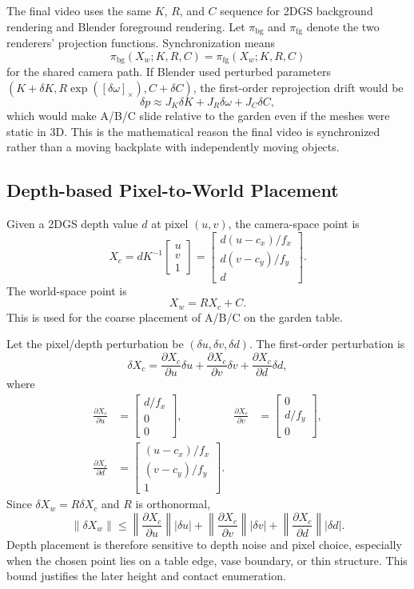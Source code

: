 \documentclass[10pt,twocolumn,letterpaper]{article}
\begin{document}
The final video uses the same $K$, $R$, and $C$ sequence for 2DGS background rendering and Blender foreground rendering.
Let $\pi_{\mathrm{bg}}$ and $\pi_{\mathrm{fg}}$ denote the two renderers' projection functions.
Synchronization means
\[
\pi_{\mathrm{bg}}(X_w;K,R,C)=\pi_{\mathrm{fg}}(X_w;K,R,C)
\]
for the shared camera path.
If Blender used perturbed parameters $(K+\delta K,R\exp([\delta\omega]_\times),C+\delta C)$, the first-order reprojection drift would be
\[
\delta p
\approx
J_K\delta K
+J_R\delta\omega
+J_C\delta C,
\]
which would make A/B/C slide relative to the garden even if the meshes were static in 3D.
This is the mathematical reason the final video is synchronized rather than a moving backplate with independently moving objects.

\subsection{Depth-based Pixel-to-World Placement}
Given a 2DGS depth value $d$ at pixel $(u,v)$, the camera-space point is
\[
X_c=dK^{-1}\begin{bmatrix}u\\v\\1\end{bmatrix}
=
\begin{bmatrix}
d(u-c_x)/f_x\\
d(v-c_y)/f_y\\
d
\end{bmatrix}.
\]
The world-space point is
\[
X_w=RX_c+C.
\]
This is used for the coarse placement of A/B/C on the garden table.

Let the pixel/depth perturbation be $(\delta u,\delta v,\delta d)$.
The first-order perturbation is
\[
\delta X_c=
\frac{\partial X_c}{\partial u}\delta u+
\frac{\partial X_c}{\partial v}\delta v+
\frac{\partial X_c}{\partial d}\delta d,
\]
where
\[
\begin{aligned}
\frac{\partial X_c}{\partial u}&=
\begin{bmatrix}d/f_x\\0\\0\end{bmatrix},&
\frac{\partial X_c}{\partial v}&=
\begin{bmatrix}0\\d/f_y\\0\end{bmatrix},\\
\frac{\partial X_c}{\partial d}&=
\begin{bmatrix}(u-c_x)/f_x\\(v-c_y)/f_y\\1\end{bmatrix}.
\end{aligned}
\]
Since $\delta X_w=R\delta X_c$ and $R$ is orthonormal,
\[
\|\delta X_w\|
\le
\left\|\frac{\partial X_c}{\partial u}\right\||\delta u|
+
\left\|\frac{\partial X_c}{\partial v}\right\||\delta v|
+
\left\|\frac{\partial X_c}{\partial d}\right\||\delta d|.
\]
Depth placement is therefore sensitive to depth noise and pixel choice, especially when the chosen point lies on a table edge, vase boundary, or thin structure.
This bound justifies the later height and contact enumeration.
\end{document}
